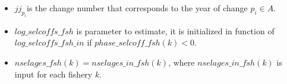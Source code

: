 \documentclass{article}
\begin{document}
\begin{itemize}
    
    \begin{itemize}
        \item $jj_{p_i}$is the change number that corresponds to the year of change $p_i\in A$.
        \item $log\_selcoffs\_fsh$ is parameter to estimate, it is initialized in function of  $log\_selcoffs\_fsh\_in$ if $phase\_selcoff\_fsh(k)<0$. %
        \item $nselages\_fsh(k)=nselages\_in\_fsh(k)$, where $nselages\_in\_fsh(k)$ is input for each fishery $k$.
    \end{itemize}














    
   
    

\end{itemize}
\end{document}
